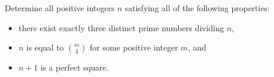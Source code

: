 Determine all positive integers $n$ satisfying all of the following properties:
\begin{itemize}
    \item there exist exactly three distinct prime numbers dividing $n$, 
    \item $n$ is equal to $\binom{m}{3}$ for some positive integer $m$, and
    \item $n+1$ is a perfect square.
\end{itemize}
